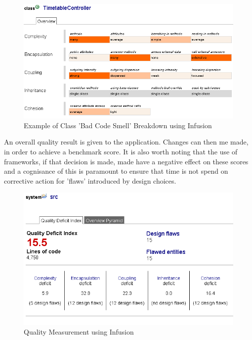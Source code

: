 \begin{figure} [H]
\begin{center}
\includegraphics[scale=0.7]{infusion3.PNG}
\caption{Example of Class 'Bad Code Smell' Breakdown using Infusion}
\label{fig:in1}
\end{center}
\end{figure}

An overall quality result is given to the application. Changes can then me made, in order to achieve a benchmark score. It is also worth noting that the use of frameworks, if that decision is made, made have a negative effect on these scores and a cognisance of this is paramount to ensure that time is not spend on corrective action for 'flaws' introduced by design choices. 

\begin{figure}[H]
\begin{center}
\includegraphics[scale=0.7]{infusion2.PNG}
\caption{Quality Measurement using Infusion}
\end{center}
\end{figure}

